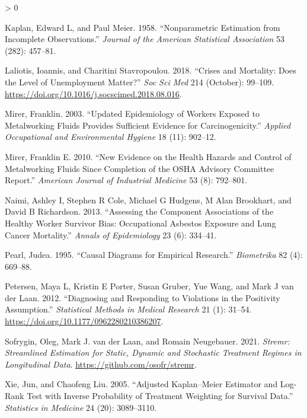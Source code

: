 \documentclass[
  11pt,
]{article}
\newlength{\cslhangindent}
\newenvironment{CSLReferences}[2] %
 {%
  \setlength{\parindent}{0pt}
  \ifodd #1 \everypar{\setlength{\hangindent}{\cslhangindent}}\ignorespaces\fi
  \ifnum #2 > 0
  \setlength{\parskip}{#2\baselineskip}
  \fi
 }%
 {}
\begin{document}
\begin{CSLReferences}{1}{0}
\leavevmode\hypertarget{ref-Kaplan_1958}{}%
Kaplan, Edward L, and Paul Meier. 1958. {``Nonparametric Estimation from
Incomplete Observations.''} \emph{Journal of the American Statistical
Association} 53 (282): 457--81.

\leavevmode\hypertarget{ref-Laliotis_2018}{}%
Laliotis, Ioannis, and Charitini Stavropoulou. 2018. {``Crises and
Mortality: Does the Level of Unemployment Matter?''} \emph{Soc Sci Med}
214 (October): 99--109.
\url{https://doi.org/10.1016/j.socscimed.2018.08.016}.

\leavevmode\hypertarget{ref-Mirer_2003}{}%
Mirer, Franklin. 2003. {``Updated Epidemiology of Workers Exposed to
Metalworking Fluids Provides Sufficient Evidence for Carcinogenicity.''}
\emph{Applied Occupational and Environmental Hygiene} 18 (11): 902--12.

\leavevmode\hypertarget{ref-Mirer_2010}{}%
Mirer, Franklin E. 2010. {``New Evidence on the Health Hazards and
Control of Metalworking Fluids Since Completion of the OSHA Advisory
Committee Report.''} \emph{American Journal of Industrial Medicine} 53
(8): 792--801.

\leavevmode\hypertarget{ref-Naimi_2013}{}%
Naimi, Ashley I, Stephen R Cole, Michael G Hudgens, M Alan Brookhart,
and David B Richardson. 2013. {``Assessing the Component Associations of
the Healthy Worker Survivor Bias: Occupational Asbestos Exposure and
Lung Cancer Mortality.''} \emph{Annals of Epidemiology} 23 (6): 334--41.

\leavevmode\hypertarget{ref-Pearl_1995}{}%
Pearl, Judea. 1995. {``Causal Diagrams for Empirical Research.''}
\emph{Biometrika} 82 (4): 669--88.

\leavevmode\hypertarget{ref-Petersen_2012}{}%
Petersen, Maya L, Kristin E Porter, Susan Gruber, Yue Wang, and Mark J
van der Laan. 2012. {``Diagnosing and Responding to Violations in the
Positivity Assumption.''} \emph{Statistical Methods in Medical Research}
21 (1): 31--54. \url{https://doi.org/10.1177/0962280210386207}.

\leavevmode\hypertarget{ref-Sofrygin_2021}{}%
Sofrygin, Oleg, Mark J. van der Laan, and Romain Neugebauer. 2021.
\emph{Stremr: Streamlined Estimation for Static, Dynamic and Stochastic
Treatment Regimes in Longitudinal Data}.
\url{https://github.com/osofr/stremr}.

\leavevmode\hypertarget{ref-Xie_2005}{}%
Xie, Jun, and Chaofeng Liu. 2005. {``Adjusted Kaplan--Meier Estimator
and Log-Rank Test with Inverse Probability of Treatment Weighting for
Survival Data.''} \emph{Statistics in Medicine} 24 (20): 3089--3110.

\end{CSLReferences}
\end{document}
